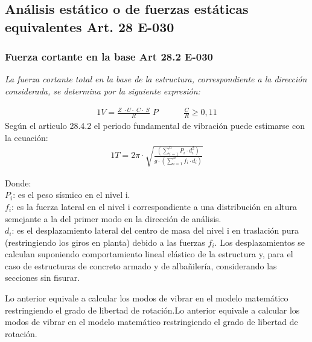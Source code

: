 \documentclass{article}%
\begin{document}
%
\subsection{Análisis estático o de fuerzas estáticas equivalentes Art. 28 E{-}030}%
\label{subsec:AnlisisestticoodefuerzasestticasequivalentesArt.28E{-}030}%

%
\subsubsection{Fuerza cortante en la base Art 28.2 E{-}030}%
\label{ssubsec:FuerzacortanteenlabaseArt28.2E{-}030}%
\begin{tcolorbox}[colback=gray!5!white,colframe=Maroon!75!black,fonttitle=\bfseries,title=Art. 28.2.1]%
\textit{La fuerza cortante total en la base de la estructura, correspondiente a la dirección considerada, se determina por la siguiente expresión:}%
\end{tcolorbox}%
\begin{alignat}{1}%
V=\frac{Z\;\cdot U\cdot\;C\cdot\;S}{R}\;P\;\;\;\;\;\;\;\;\;\;\;\frac{C}{R}\geq 0,11%
\end{alignat}%
Según el articulo 28.4.2 el periodo fundamental de vibración puede estimarse con la ecuación:%
\begin{alignat}{1}%
T=2\pi\cdot \displaystyle\sqrt{\frac{\left (\displaystyle\sum_{i=1}^{n} P_{i}\cdot d_{i}^{2}\right )}{g\cdot\left (\displaystyle\sum_{i=1}^{n}f_{i}\cdot d_{i}  \right ) }}%
\end{alignat}%
\begin{flushleft}%
Donde:\\%
$P_{i}$: es el peso sísmico en el nivel i.\\%
$f_{i}$: es la fuerza lateral en el nivel i correspondiente a una distribución en altura semejante a la del primer modo en la dirección de análisis.\\%
$d_{i}$: es el desplazamiento lateral del centro de masa del nivel  i en traslación pura (restringiendo los giros en planta) debido a las fuerzas $f_{i}$. Los desplazamientos se calculan suponiendo comportamiento lineal elástico de la estructura y, para el caso de estructuras de concreto armado y de albañilería, considerando las secciones sin fisurar.\\%
\end{flushleft}%
Lo anterior equivale a calcular los modos de vibrar en el modelo matemático restringiendo el grado de libertad de rotación.Lo anterior equivale a calcular los modos de vibrar en el modelo matemático restringiendo el grado de libertad de rotación.%
\end{document}
